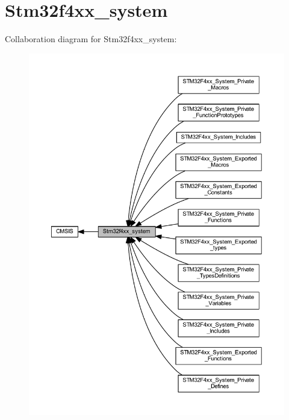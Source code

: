 \hypertarget{group__stm32f4xx__system}{}\section{Stm32f4xx\+\_\+system}
\label{group__stm32f4xx__system}
Collaboration diagram for Stm32f4xx\+\_\+system\+:\nopagebreak
\begin{figure}[H]
\begin{center}
\leavevmode
\includegraphics[width=350pt]{group__stm32f4xx__system}
\end{center}
\end{figure}
